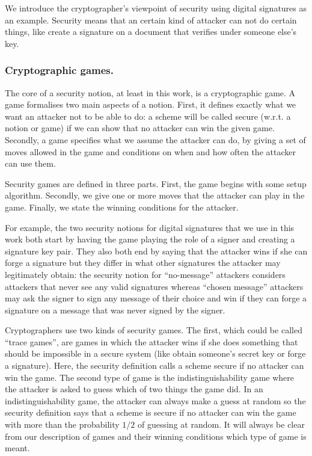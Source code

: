 \documentclass[envcountsame]{llncs}
\begin{document}
We introduce the cryptographer's viewpoint of security using digital signatures
as an example. Security means that an certain kind of attacker can not do
certain things, like create a signature on a document that verifies under
someone else's key.

\subsubsection{Cryptographic games.}
The core of a security notion, at least in this work, is a cryptographic game. A
game formalises two main aspects of a notion. First, it defines exactly what we
want an attacker not to be able to do: a scheme will be called secure (w.r.t. a
notion or game) if we can show that no attacker can win the given game.
Secondly, a game specifies what we assume the attacker can do, by giving a set
of moves allowed in the game and conditions on when and how often the attacker
can use them.

Security games are defined in three parts. First, the game begins with some
setup algorithm. Secondly, we give one or more moves that the attacker can play
in the game. Finally, we state the winning conditions for the attacker.

For example, the two security notions for digital signatures that we use in this
work both start by having the game playing the role of a signer and creating a
signature key pair. They also both end by saying that the attacker wins if she
can forge a signature but they differ in what other signatures the attacker may
legitimately obtain: the security notion for ``no-message'' attackers considers
attackers that never see any valid signatures whereas ``chosen message''
attackers may ask the signer to sign any message of their choice and win if they
can forge a signature on a message that was never signed by the signer.

Cryptographers use two kinds of security games. The first, which could be called
``trace games'', are games in which the attacker wins if she does something that
should be impossible in a secure system (like obtain someone's secret key or
forge a signature). Here, the security definition calls a scheme secure if no
attacker can win the game. The second type of game is the indistinguishability
game where the attacker is asked to guess which of two things the game did. In
an indistinguishability game, the attacker can always make a guess at random so
the security definition says that a scheme is secure if no attacker can win the
game with more than the probability $1/2$ of guessing at random. It will always
be clear from our description of games and their winning conditions which type
of game is meant.
\end{document}
